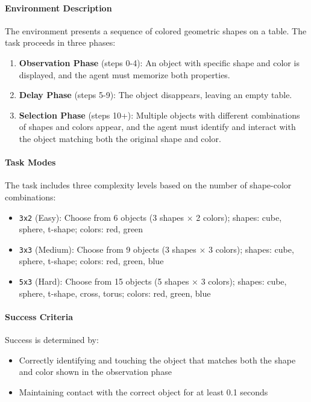 \paragraph{Environment Description} The environment presents a sequence of colored geometric shapes on a table. The task proceeds in three phases:
\begin{enumerate}
    \item \textbf{Observation Phase} (steps 0-4): An object with specific shape and color is displayed, and the agent must memorize both properties.
    \item \textbf{Delay Phase} (steps 5-9): The object disappears, leaving an empty table.
    \item \textbf{Selection Phase} (steps 10+): Multiple objects with different combinations of shapes and colors appear, and the agent must identify and interact with the object matching both the original shape and color.
\end{enumerate}

\paragraph{Task Modes} The task includes three complexity levels based on the number of shape-color combinations:
\begin{itemize}
    \item \texttt{3x2} (Easy): Choose from 6 objects (3 shapes × 2 colors); shapes: cube, sphere, t-shape; colors: red, green
    \item \texttt{3x3} (Medium): Choose from 9 objects (3 shapes × 3 colors); shapes: cube, sphere, t-shape; colors: red, green, blue
    \item \texttt{5x3} (Hard): Choose from 15 objects (5 shapes × 3 colors); shapes: cube, sphere, t-shape, cross, torus; colors: red, green, blue
\end{itemize}

\paragraph{Success Criteria} Success is determined by:
\begin{itemize}
    \item Correctly identifying and touching the object that matches both the shape and color shown in the observation phase
    \item Maintaining contact with the correct object for at least 0.1 seconds
\end{itemize}

